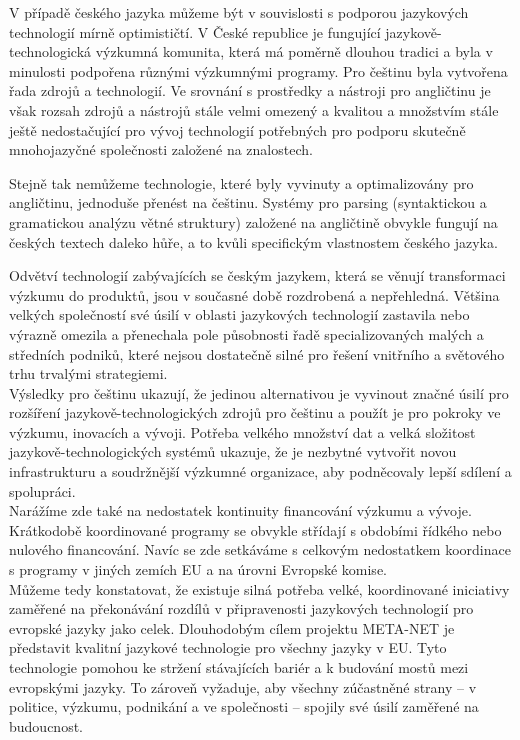 \begin{multicols}{2}
V případě českého jazyka můžeme být v souvislosti s podporou jazykových technologií mírně optimističtí. V České republice je fungující jazykově-technologická výzkumná komunita, která má poměrně dlouhou tradici a byla v minulosti podpořena různými výzkumnými programy. Pro češtinu byla vytvořena řada zdrojů a technologií. Ve srovnání s prostředky a nástroji pro angličtinu je však rozsah zdrojů a nástrojů stále velmi omezený a kvalitou a množstvím stále ještě nedostačující pro vývoj technologií potřebných pro podporu skutečně mnohojazyčné společnosti založené na znalostech. 

Stejně tak nemůžeme technologie, které byly vyvinuty a optimalizovány pro angličtinu, jednoduše přenést na češtinu. Systémy pro parsing (syntaktickou a gramatickou analýzu větné struktury) založené na angličtině obvykle fungují na českých textech daleko hůře, a to kvůli specifickým vlastnostem českého jazyka. 

Odvětví technologií zabývajících se českým jazykem, která se věnují transformaci výzkumu do produktů, jsou v současné době rozdrobená a nepřehledná. Většina velkých společností své úsilí v oblasti jazykových technologií zastavila nebo výrazně omezila a přenechala pole působnosti řadě specializovaných malých a středních podniků, které nejsou dostatečně silné pro řešení vnitřního a světového trhu trvalými strategiemi.\\ 
Výsledky pro češtinu ukazují, že jedinou alternativou je vyvinout značné úsilí pro rozšíření jazykově-technologických zdrojů pro češtinu a použít je pro pokroky ve výzkumu, inovacích a vývoji. Potřeba velkého množství dat a velká složitost jazykově-technologických systémů ukazuje, že je nezbytné vytvořit novou infrastrukturu a soudržnější výzkumné organizace, aby podněcovaly lepší sdílení a spolupráci. \\
Narážíme zde také na nedostatek kontinuity financování výzkumu a vývoje. Krátkodobě koordinované programy se obvykle střídají s obdobími řídkého nebo nulového financování. Navíc se zde setkáváme s celkovým nedostatkem koordinace s programy v jiných zemích EU a na úrovni Evropské komise.\\
Můžeme tedy konstatovat, že existuje silná potřeba velké, koordinované iniciativy zaměřené na překonávání rozdílů v připravenosti jazykových technologií pro evropské jazyky jako celek. Dlouhodobým cílem projektu META-NET je představit kvalitní jazykové technologie pro všechny jazyky v EU. Tyto technologie pomohou ke stržení stávajících bariér a k budování mostů mezi evropskými jazyky. To zároveň vyžaduje, aby všechny zúčastněné strany – v politice, výzkumu, podnikání a ve společnosti – spojily své úsilí zaměřené na budoucnost.
\end{multicols}
